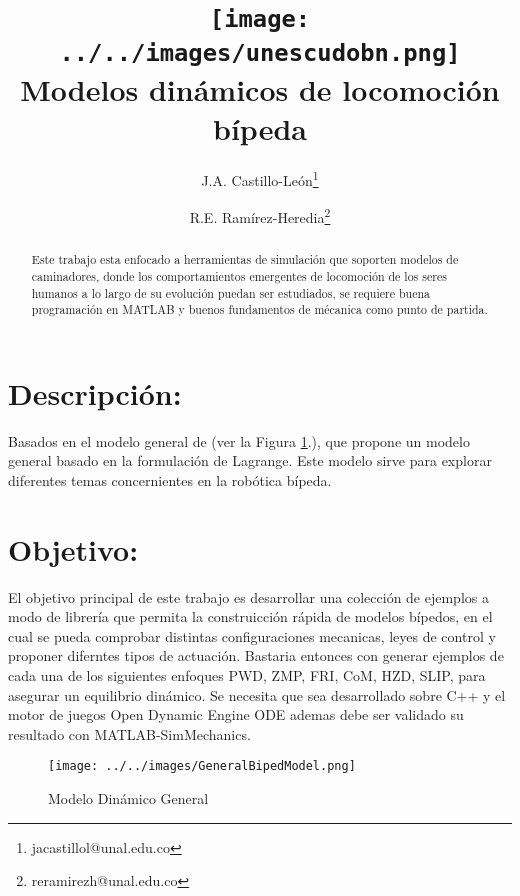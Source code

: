 \documentclass[10pt,onecolumn,twoside,letterpaper]{article}
\title{\vspace{-0.8cm}\texttt{[image: ../../images/unescudobn.png]}\\\vspace{-0.0cm}
  \LARGE \textbf{Modelos din\'amicos de locomoci\'on b\'ipeda}}
\author{J.A. Castillo-Le\'on\thanks{jacastillol@unal.edu.co} \and R.E. Ram\'irez-Heredia\thanks{reramirezh@unal.edu.co}}
\date{}
\begin{document}
\maketitle
\begin{abstract}\small
  Este trabajo esta enfocado a herramientas de simulaci\'on que soporten modelos de caminadores, donde los comportamientos emergentes de locomoci\'on de los seres humanos a lo largo de su evoluci\'on puedan ser estudiados, se requiere buena programaci\'on en MATLAB y buenos fundamentos de m\'ecanica como punto de partida.
\end{abstract}
\section{Descripci\'on:}
Basados en el modelo general de \cite{Grizzle2014} (ver la Figura \ref{fig:grizmodelo}.), que propone un modelo general basado en la formulaci\'on de Lagrange. Este modelo sirve para explorar diferentes temas concernientes en la rob\'otica b\'ipeda.
\section{Objetivo:}
El objetivo principal de este trabajo es desarrollar una colecci\'on de ejemplos a modo de librer\'ia que permita la construicci\'on r\'apida de modelos b\'ipedos, en el cual se pueda comprobar distintas configuraciones mecanicas, leyes de control y proponer diferntes tipos de actuaci\'on. Bastaria entonces con generar ejemplos de cada una de los siguientes enfoques PWD, ZMP, FRI, CoM, HZD, SLIP, para asegurar un equilibrio din\'amico. Se necesita que sea desarrollado sobre C++ y el motor de juegos Open Dynamic Engine ODE ademas debe ser validado su resultado con MATLAB-SimMechanics.
\begin{figure}[!ht]
  \centering
  \texttt{[image: ../../images/GeneralBipedModel.png]}
  \caption{Modelo Din\'amico General}
  \label{fig:grizmodelo}
\end{figure}

\end{document}
